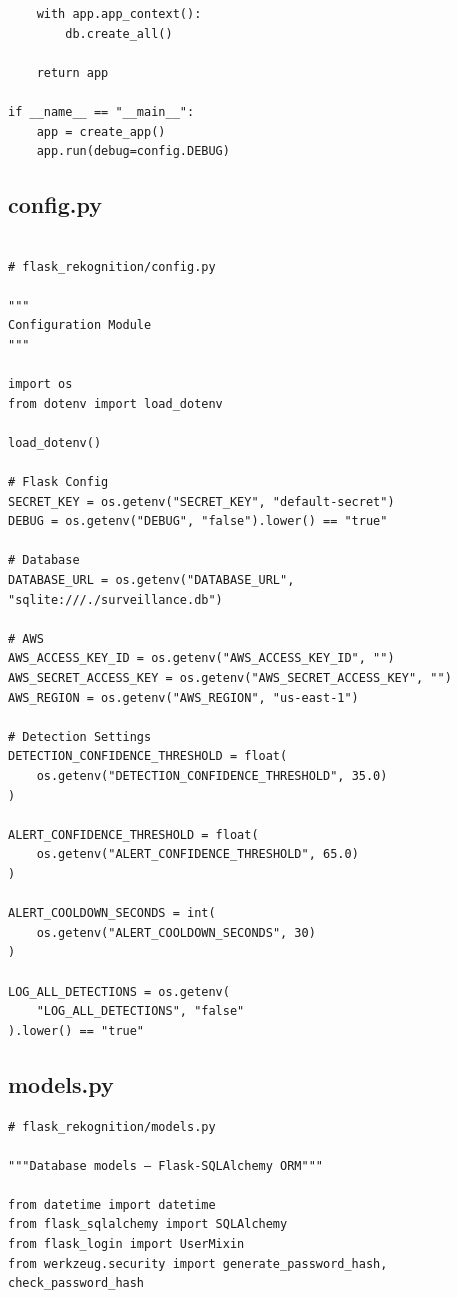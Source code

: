 \documentclass[10pt,openany]{report}
\begin{document}
\begin{sloppypar}
{{{\begin{sloppypar}
\begin{lstlisting}
    with app.app_context():
        db.create_all()

    return app

if __name__ == "__main__":
    app = create_app()
    app.run(debug=config.DEBUG)
\end{lstlisting}

\subsection{config.py}
\begin{lstlisting}

# flask_rekognition/config.py

"""
Configuration Module
"""

import os
from dotenv import load_dotenv

load_dotenv()

# Flask Config
SECRET_KEY = os.getenv("SECRET_KEY", "default-secret")
DEBUG = os.getenv("DEBUG", "false").lower() == "true"

# Database
DATABASE_URL = os.getenv("DATABASE_URL", "sqlite:///./surveillance.db")

# AWS
AWS_ACCESS_KEY_ID = os.getenv("AWS_ACCESS_KEY_ID", "")
AWS_SECRET_ACCESS_KEY = os.getenv("AWS_SECRET_ACCESS_KEY", "")
AWS_REGION = os.getenv("AWS_REGION", "us-east-1")

# Detection Settings
DETECTION_CONFIDENCE_THRESHOLD = float(
    os.getenv("DETECTION_CONFIDENCE_THRESHOLD", 35.0)
)

ALERT_CONFIDENCE_THRESHOLD = float(
    os.getenv("ALERT_CONFIDENCE_THRESHOLD", 65.0)
)

ALERT_COOLDOWN_SECONDS = int(
    os.getenv("ALERT_COOLDOWN_SECONDS", 30)
)

LOG_ALL_DETECTIONS = os.getenv(
    "LOG_ALL_DETECTIONS", "false"
).lower() == "true"
\end{lstlisting}
\subsection{models.py}

\begin{lstlisting}
# flask_rekognition/models.py

"""Database models — Flask-SQLAlchemy ORM"""

from datetime import datetime
from flask_sqlalchemy import SQLAlchemy
from flask_login import UserMixin
from werkzeug.security import generate_password_hash, check_password_hash


\end{lstlisting}
\end{sloppypar}}}}
\end{sloppypar}
\end{document}
